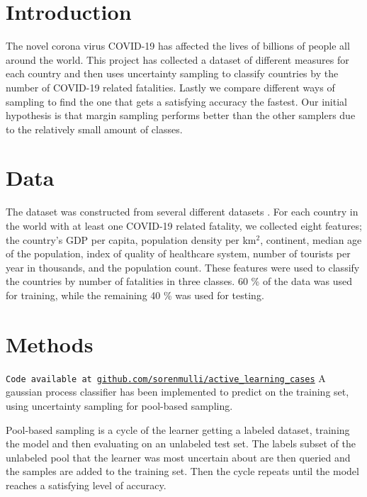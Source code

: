 \documentclass[12pt,fleqn]{article}
\begin{document}
	\begin{multicols}{2}
		
		
		\section{Introduction} %
		The novel corona virus COVID-19 has affected the lives of billions of people all around the world. This project has collected a dataset of different measures for each country and then uses uncertainty sampling to classify countries by the number of COVID-19 related fatalities. Lastly we compare different ways of sampling to find the one that gets a satisfying accuracy the fastest. Our initial hypothesis is that margin sampling performs better than the other samplers due to the relatively small amount of classes. 
		
		\section{Data}
		The dataset was constructed from several different datasets \cite{density, corona, alder, bnp, region, healthcare, turist}. For each country in the world with at least one COVID-19 related fatality, we collected eight features; the country's GDP per capita, population density per km$^2$, continent, median age of the population, index of quality of healthcare system, number of tourists per year in thousands, and the population count. These features were used to classify the countries by number of fatalities in three classes. 60 \% of the data was used for training, while the remaining 40 \% was used for testing. %

		\section{Methods}
		\texttt{Code available at \url{github.com/sorenmulli/active_learning_cases}} \newline
		A gaussian process classifier has been implemented to predict on the training set, using uncertainty sampling for pool-based sampling.

		Pool-based sampling is a cycle of the learner getting a labeled dataset, training the model and then evaluating on an unlabeled test set. The labels subset of the unlabeled pool that the learner was most uncertain about are then queried and the samples are added to the training set. Then the cycle repeats until the model reaches a satisfying level of accuracy.  
		

\end{multicols}
\end{document}
